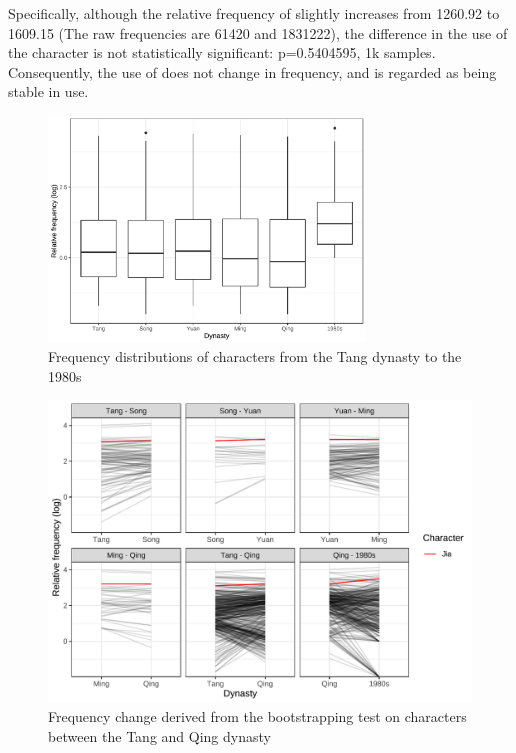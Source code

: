 Specifically, although the relative frequency of \jia slightly increases from \num{1260.92} to \num{1609.15} (The raw frequencies are \num{61420} and \num{1831222}), the difference in the use of the character is not statistically significant: p=0.5404595, 1k samples. Consequently, the use of \jia does not change in frequency, and is regarded as being stable in use.

\begin{figure}[H]
\centering
\includegraphics[width=0.75\textwidth,keepaspectratio]{figures_new/char_freq/char_freq_dist_boxplot.pdf}
\caption{Frequency distributions of characters from the Tang dynasty to the 1980s}
\end{figure}

\begin{figure}[H]
\centering
\includegraphics[height=0.4\textheight,keepaspectratio]{figures_new/char_freq/char_freq_change_lineplot.pdf}
\caption{Frequency change derived from the bootstrapping test on characters between the Tang and Qing dynasty}
\label{fig:freq_boot}
\end{figure}


